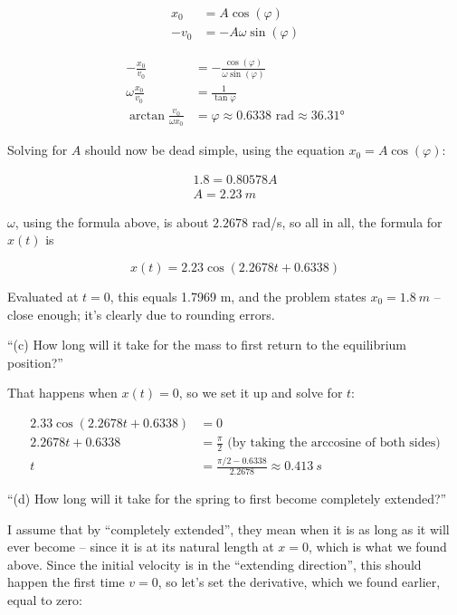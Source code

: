 \documentclass[8.01x]{subfiles}
\begin{document}
\begin{align}
x_0  &= A \cos(\varphi)\\
-v_0 &= -A \omega \sin(\varphi)
\end{align}

\begin{align}
-\frac{x_0}{v_0}  &= -\frac{\cos(\varphi)}{\omega \sin(\varphi)}\\
\omega \frac{x_0}{v_0}  &= \frac{1}{\tan \varphi}\\
\arctan \frac{v_0}{\omega x_0}  &= \varphi \approx 0.6338 \text{ rad} \approx \ang{36.31}
\end{align}

Solving for $A$ should now be dead simple, using the equation $x_0 = A \cos(\varphi)$:

\begin{align}
1.8 = 0.80578 A\\
A = \SI{2.23}{m}
\end{align}

$\omega$, using the formula above, is about $2.2678$ rad/s, so all in all, the formula for $x(t)$ is

\begin{equation}
x(t) = 2.23 \cos(2.2678 t + 0.6338)
\end{equation}

Evaluated at $t = 0$, this equals 1.7969 m, and the problem states $x_0 = \SI{1.8}{m}$ -- close enough; it's clearly due to rounding errors.

``(c) How long will it take for the mass to first return to the equilibrium position?''

That happens when $x(t) = 0$, so we set it up and solve for $t$:

\begin{align}
2.33 \cos(2.2678 t + 0.6338) &= 0\\
2.2678 t + 0.6338 &= \frac{\pi}{2} \text{ (by taking the arccosine of both sides)}\\
t &= \frac{\pi/2 - 0.6338}{2.2678} \approx \SI{0.413}{s}
\end{align}

``(d) How long will it take for the spring to first become completely extended?''

I assume that by ``completely extended'', they mean when it is as long as it will ever become -- since it is at its natural length at $x = 0$, which is what we found above. Since the initial velocity is in the ``extending direction'', this should happen the first time $v = 0$, so let's set the derivative, which we found earlier, equal to zero:
\end{document}
